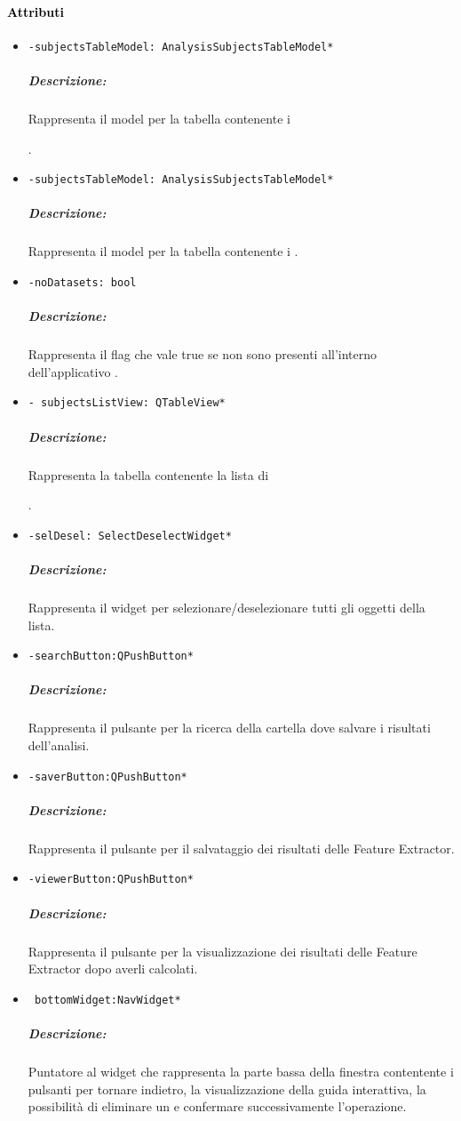 \paragraph{\textcolor{black}{Attributi\\}}
\begin{itemize}
\item\color{teal}\verb!-subjectsTableModel: AnalysisSubjectsTableModel*!
\color{black}
\subparagraph{Descrizione:} Rappresenta il model per la tabella contenente i \subject{}. 

\item\color{teal}\verb!-subjectsTableModel: AnalysisSubjectsTableModel*!
\color{black}
\subparagraph{Descrizione:} Rappresenta il model per la tabella contenente i \protocol{}. 

\item\color{teal}\verb!-noDatasets: bool!
\color{black}
\subparagraph{Descrizione:} Rappresenta il flag che vale true se non sono presenti \dataset{} all'interno dell'applicativo \project{}. 

\item\color{teal}\verb!- subjectsListView: QTableView*!
\color{black}
\subparagraph{Descrizione:} Rappresenta la tabella contenente la lista di \subject{}.

\item\color{teal}\verb!-selDesel: SelectDeselectWidget*!
\color{black}
\subparagraph{Descrizione:} Rappresenta il widget per selezionare/deselezionare tutti gli oggetti della lista.

\item\color{teal}\verb!-searchButton:QPushButton*!
\color{black}
\subparagraph{Descrizione:} Rappresenta il pulsante per la ricerca della cartella dove salvare i risultati dell'analisi.

\item\color{teal}\verb!-saverButton:QPushButton*!
\color{black}
\subparagraph{Descrizione:} Rappresenta il pulsante per il salvataggio dei risultati delle Feature Extractor\g{}.

\item\color{teal}\verb!-viewerButton:QPushButton*!
\color{black}
\subparagraph{Descrizione:} Rappresenta il pulsante per la visualizzazione dei risultati delle Feature Extractor\g{} dopo averli calcolati.

\item\color{teal}\verb! bottomWidget:NavWidget*!
\color{black} 
\subparagraph{Descrizione:}
Puntatore al widget che rappresenta la parte bassa della finestra contentente i pulsanti per tornare indietro, la visualizzazione della guida interattiva, la possibilità di eliminare un \dataset{} e confermare successivamente l'operazione.
\end{itemize}
